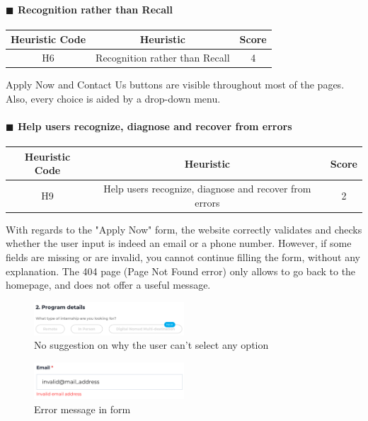 \documentclass[11pt]{article} %
\begin{document}
\paragraph{$\blacksquare$ Recognition rather than Recall}
\begin{center}
    \begin{tabular}{|c|c|c|} 
    \hline
    \textbf{Heuristic Code} & \textbf{Heuristic} & \textbf{Score}\\ 
    \hline
    H6 & Recognition rather than Recall & 4 \\
    \hline
    \end{tabular}
\end{center}
Apply Now and Contact Us buttons are  visible throughout most of the pages. Also, every choice is aided by a drop-down menu.

\paragraph{$\blacksquare$ Help users recognize, diagnose and recover from errors}
\begin{center}
    \begin{tabular}{|c|c|c|} 
    \hline
    \textbf{Heuristic Code} & \textbf{Heuristic} & \textbf{Score}\\ 
    \hline
    H9 & Help users recognize, diagnose and recover from errors & 2 \\
    \hline
    \end{tabular}
\end{center}
With regards to the "Apply Now" form, the website correctly validates and checks whether the user input is indeed an email or a phone number. However, if some fields are missing or are invalid, you cannot continue filling the form, without any explanation.
The 404 page (Page Not Found error) only allows to go back to the homepage, and does not offer a useful message.

\begin{figure}[H]
  \centering
  \includegraphics[width=0.5\textwidth]{Images/Screenshots/ApplyNow cant continue.png}
  \caption{No suggestion on why the user can't select any option}
\end{figure}

\begin{figure}[H]
  \centering
  \includegraphics[width=0.5\textwidth]{Images/Screenshots/Invalid Mail Address.png}
  \caption{Error message in form}
\end{figure}
\end{document}
